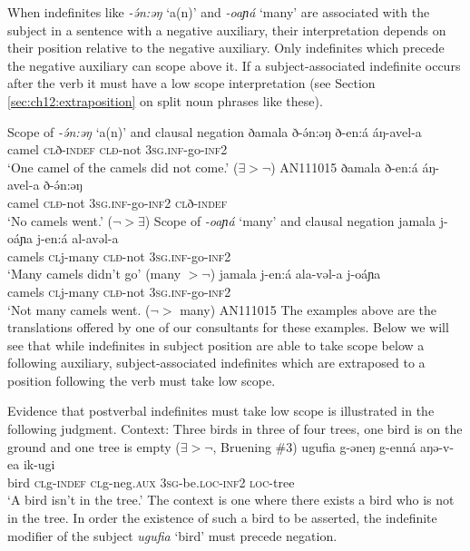 When indefinites like \textit{-ə́n:əŋ} `a(n)' and \textit{-oaɲá} `many' are associated with the subject in a sentence with a negative auxiliary, their interpretation depends on their position relative to the negative auxiliary. Only indefinites which precede the negative auxiliary can scope above it. If a subject-associated indefinite occurs after the verb it must have a low scope interpretation (see Section \ref{sec:ch12:extraposition} on split noun phrases like these).

\ea  Scope of \textit{-ə́n:əŋ} `a(n)' and clausal negation
	\ea \gll ðamala ð-ə́n:əŋ ð-en:á áŋ-avel-a	    \\
			camel \textsc{cl}ð-\textsc{indef} \textsc{clð}-not \textsc{3sg.inf}-go-\textsc{inf2}\\
			\glt ‘One camel of the camels did not come.’ ($\exists > \neg$) \hfill 	AN111015 \label{ex:ch8:awide}
	\ex 	\gll ðamala ð-en:á áŋ-avel-a ð-ə́n:əŋ	    \\   
			 camel  \textsc{clð}-not \textsc{3sg.inf}-go-\textsc{inf2} \textsc{cl}ð-\textsc{indef} \\
			\glt ‘No camels went.’ ($\neg>\exists$)
	\z 
\ex Scope of \textit{-oaɲá} `many' and clausal negation
	\ea \gll jamala j-oáɲa j-en:á al-avəl-a	\\
			camels \textsc{cl}j-many \textsc{clð}-not \textsc{3sg.inf}-go-\textsc{inf2} \\
		\glt ‘Many camels didn’t go’  (many $> \neg$)
	\ex \gll  jamala j-en:á ala-vəl-a j-oáɲa\\
	camels \textsc{cl}j-many \textsc{clð}-not \textsc{3sg.inf}-go-\textsc{inf2} \\	
		\glt ‘Not many camels went. ($\neg >$ many) \hfill AN111015
	\z
\z
The examples above are the translations offered by one of our consultants for these examples. Below we will see that while indefinites in subject position are able to take scope below a following auxiliary, subject-associated indefinites which are extraposed to a position following the verb must take low scope.

Evidence that postverbal indefinites must take low scope is illustrated in the following judgment.
\ea Context: Three birds in three of four trees, one bird is on the ground and one tree is empty ($\exists>\neg$, Bruening \#3)
	\ea  \gll ugufia g-əneŋ g-enná aŋə-v-ea ik-ugi	\\
			 bird \textsc{cl}g-\textsc{indef} \textsc{cl}g-neg.\textsc{aux} 3\textsc{sg}-be.\textsc{loc}-\textsc{inf}2 \textsc{loc}-tree\\
		\glt 	‘A bird isn’t in the tree.’ \label{ex:ch8:indefneg}
	 \label{ex:ch8:negindef}
	\z
\z
The context is one where there exists a bird who is not in the tree. In order the existence of such a bird to be asserted, the indefinite modifier of the subject \textit{ugufia} `bird' must precede negation. 

